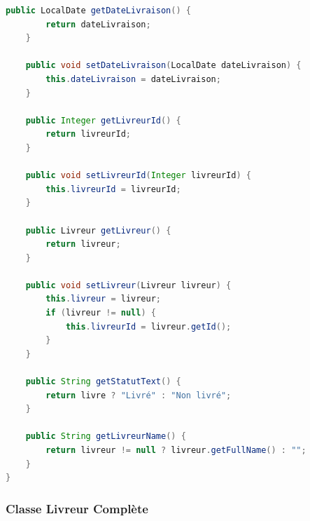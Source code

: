 \documentclass{rapportENSIAS}
\begin{document}
\begin{lstlisting}[language=Java, caption=Classe Colis compl\`{e}te]
    public LocalDate getDateLivraison() {
        return dateLivraison;
    }

    public void setDateLivraison(LocalDate dateLivraison) {
        this.dateLivraison = dateLivraison;
    }

    public Integer getLivreurId() {
        return livreurId;
    }

    public void setLivreurId(Integer livreurId) {
        this.livreurId = livreurId;
    }

    public Livreur getLivreur() {
        return livreur;
    }

    public void setLivreur(Livreur livreur) {
        this.livreur = livreur;
        if (livreur != null) {
            this.livreurId = livreur.getId();
        }
    }

    public String getStatutText() {
        return livre ? "Livré" : "Non livré";
    }

    public String getLivreurName() {
        return livreur != null ? livreur.getFullName() : "";
    }
}
\end{lstlisting}

\subsubsection{Classe Livreur Compl\`{e}te}
\end{document}
